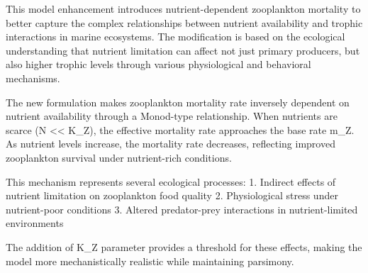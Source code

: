 This model enhancement introduces nutrient-dependent zooplankton mortality to better capture the complex relationships between nutrient availability and trophic interactions in marine ecosystems. The modification is based on the ecological understanding that nutrient limitation can affect not just primary producers, but also higher trophic levels through various physiological and behavioral mechanisms.

The new formulation makes zooplankton mortality rate inversely dependent on nutrient availability through a Monod-type relationship. When nutrients are scarce (N << K_Z), the effective mortality rate approaches the base rate m_Z. As nutrient levels increase, the mortality rate decreases, reflecting improved zooplankton survival under nutrient-rich conditions.

This mechanism represents several ecological processes:
1. Indirect effects of nutrient limitation on zooplankton food quality
2. Physiological stress under nutrient-poor conditions
3. Altered predator-prey interactions in nutrient-limited environments

The addition of K_Z parameter provides a threshold for these effects, making the model more mechanistically realistic while maintaining parsimony.
